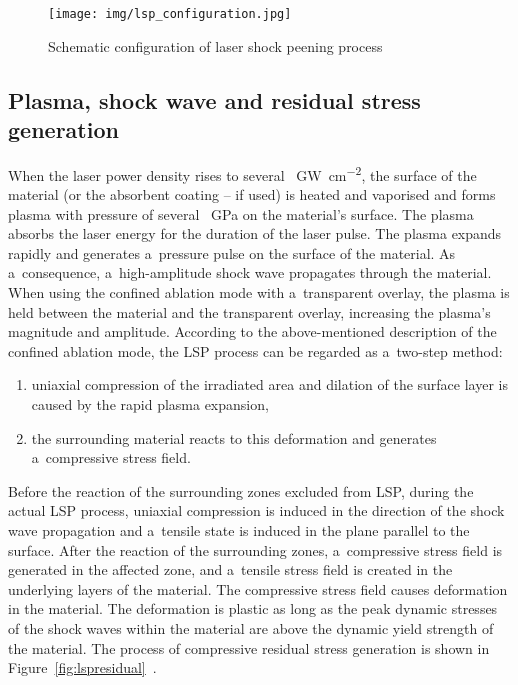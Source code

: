 \begin{figure}[h]
    \centering
    \texttt{[image: img/lsp\_configuration.jpg]}
    \caption[Schematic configuration of laser shock peening process]{Schematic configuration of laser shock peening process \protect\cite{bohm_kaufman_brajer_rostohar_2019}}
    \label{fig:lspconfiguration}
\end{figure}

\subsection{Plasma, shock wave and residual stress generation}

When the laser power density rises to several \SI{}{\giga\watt\per\cm\squared},  the surface of the material (or the absorbent coating -- if used) is heated and vaporised and forms plasma with pressure of several \SI{}{\giga\pascal} on the material's surface. The plasma absorbs the laser energy for the duration of the laser pulse. The plasma expands rapidly and generates a~pressure pulse on the surface of the material.
As a~consequence, a~high-amplitude shock wave propagates through the material. When using the confined ablation mode with a~transparent overlay, the plasma is held between the material and the transparent overlay, increasing the plasma's magnitude and amplitude. According to the above-mentioned description of the confined ablation mode, the LSP process can be regarded as a~two-step method: 
\begin{enumerate}

    \item uniaxial compression of the irradiated area and dilation of the surface layer is caused by the rapid plasma expansion,
    
    \item the surrounding material reacts to this deformation and generates a~compressive stress field.
    
\end{enumerate}

Before the reaction of the surrounding zones excluded from LSP, during the actual LSP process, uniaxial compression is induced in the direction of the shock wave propagation and a~tensile state is induced in the plane parallel to the surface. 
After the reaction of the surrounding zones, a~compressive stress field is generated in the affected zone, and a~tensile stress field is created in the underlying layers of the material. 
The compressive stress field causes deformation in the material. The deformation is plastic as long as the peak dynamic stresses of the shock waves within the material are above the dynamic yield strength of the material. The process of compressive residual stress generation is shown in Figure~\ref{fig:lspresidual}~\cite{fabbro_peyre_berthe_scherpereel_1998}.



